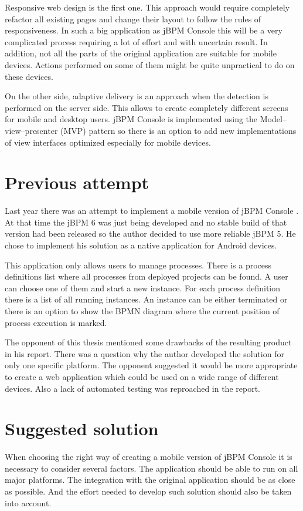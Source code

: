 \documentclass[12pt,oneside,final]{fithesis2}
\begin{document}
Responsive web design is the first one.
This approach would require completely refactor all existing pages and change their layout to follow the rules of responsiveness.
In such a big application as jBPM Console this will be a very complicated process requiring a lot of effort and with uncertain result.
In addition, not all the parts of the original application are suitable for mobile devices.
Actions performed on some of them might be quite unpractical to do on these devices.

On the other side, adaptive delivery is an approach when the detection is performed on the server side.
This allows to create completely different screens for mobile and desktop users.
jBPM Console is implemented using the Model–view–presenter (MVP) pattern so there is an option to add new implementations of view interfaces optimized especially for mobile devices.

\section{Previous attempt}
Last year there was an attempt to implement a mobile version of jBPM Console \cite{petovsky13}.
At that time the jBPM 6 was just being developed and no stable build of that version had been released so the author decided to use more reliable jBPM 5.
He chose to implement his solution as a native application for Android devices.

This application only allows users to manage processes.
There is a process definitions list where all processes from deployed projects can be found.
A user can choose one of them and start a new instance.
For each process definition there is a list of all running instances.
An instance can be either terminated or there is an option to show the BPMN diagram where the current position of process execution is marked.

The opponent of this thesis mentioned some drawbacks of the resulting product in his report.
There was a question why the author developed the solution for only one specific platform.
The opponent suggested it would be more appropriate to create a web application which could be used on a wide range of different devices.
Also a lack of automated testing was reproached in the report.

\section{Suggested solution}
When choosing the right way of creating a mobile version of jBPM Console it is necessary to consider several factors.
The application should be able to run on all major platforms.
The integration with the original application should be as close as possible.
And the effort needed to develop such solution should also be taken into account.
\end{document}

